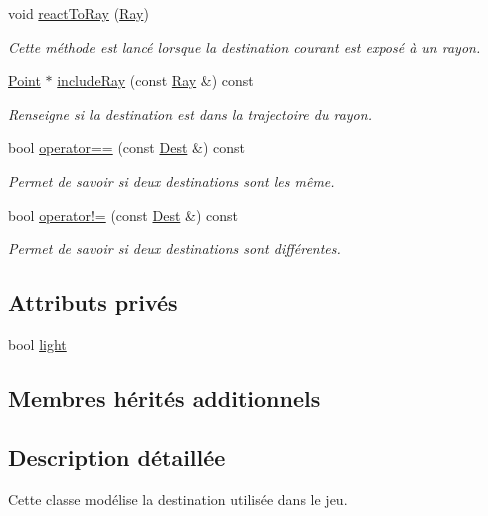\begin{DoxyCompactItemize}
void \hyperlink{classDest_ad4f6b777efe8d4cd277e635c2c2ee3df}{react\+To\+Ray} (\hyperlink{classRay}{Ray})
\begin{DoxyCompactList}\small\item\em Cette méthode est lancé lorsque la destination courant est exposé à un rayon. \end{DoxyCompactList}\item 
\hyperlink{classPoint}{Point} $\ast$ \hyperlink{classDest_aa0ec59799948c6a949907db4a12e2f11}{include\+Ray} (const \hyperlink{classRay}{Ray} \&) const 
\begin{DoxyCompactList}\small\item\em Renseigne si la destination est dans la trajectoire du rayon. \end{DoxyCompactList}\item 
bool \hyperlink{classDest_a0329ceede6eacadc211890bb3397197c}{operator==} (const \hyperlink{classDest}{Dest} \&) const 
\begin{DoxyCompactList}\small\item\em Permet de savoir si deux destinations sont les même. \end{DoxyCompactList}\item 
bool \hyperlink{classDest_a5d62d68ec9de0d58920a82a00ed72a53}{operator!=} (const \hyperlink{classDest}{Dest} \&) const 
\begin{DoxyCompactList}\small\item\em Permet de savoir si deux destinations sont différentes. \end{DoxyCompactList}\end{DoxyCompactItemize}
\subsection*{Attributs privés}
\begin{DoxyCompactItemize}
\item 
bool \hyperlink{classDest_abde9aa4bba2ce7868d90fa873761753d}{light}
\end{DoxyCompactItemize}
\subsection*{Membres hérités additionnels}


\subsection{Description détaillée}
Cette classe modélise la destination utilisée dans le jeu. 

